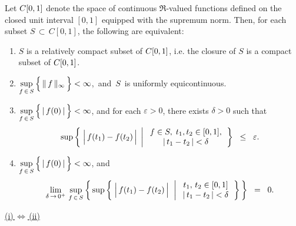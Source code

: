 \begin{theorem}
\label{BillingsleyArzelaAscoli}
\mbox{}\vskip 0.1cm
\noindent
Let $C[0,1]$ denote the space of continuous $\Re$-valued functions
defined on the closed unit interval $[0,1]$ equipped with the supremum norm.
Then, for each subset $S \,\subset\, C[0,1]$, the following are equivalent:
\begin{enumerate}
\item	$S$ is a relatively compact subset of $C[0,1]$, i.e. the closure of $S$ is a compact subset of $C[0,1]$.
\item	$\underset{f\,\in\,S}{\sup}\left\{\,\Vert\,\overset{{\color{white}.}}{f}\,\Vert_{\infty}\,\right\} < \infty$,\,
		and \,$S$\, is uniformly equicontinuous.
\item	$\underset{f\,\in\,S}{\sup}\left\{\,\vert\,\overset{{\color{white}.}}{f}(0)\,\vert\,\right\} < \infty$, and
		for each $\varepsilon > 0$, there exists $\delta > 0$ such that
		\begin{equation*}
		\sup\left\{\;
		\left\vert\,\overset{{\color{white}.}}{f}(t_{1}) - f(t_{2})\,\right\vert
		\;\left\vert\;
		\begin{array}{c} f \in S, \; t_{1},t_{2} \in [0,1], \\ \vert\,t_{1} - t_{2}\,\vert < \delta \end{array}
		\right.
		\right\}
		\;\;\leq\;\; \varepsilon.
		\end{equation*}
\item	$\underset{f\,\in\,S}{\sup}\left\{\,\vert\,\overset{{\color{white}.}}{f}(0)\,\vert\,\right\} < \infty$, and
		\begin{equation*}
		\lim_{\delta\,\rightarrow\,0^{+}}\,
			\sup_{f\,\in\,S}\left\{\,
				\sup\left\{\;
				\left\vert\,\overset{{\color{white}.}}{f}(t_{1}) - f(t_{2})\,\right\vert
				\,\;\left\vert\;
				\begin{array}{c} t_{1}, \, t_{2} \in [0,1] \\ \vert\,t_{1} - t_{2}\,\vert < \delta \end{array}
				\right.
				\right\}
			\,\right\}
		\;\;=\;\; 0.
		\end{equation*}
\end{enumerate}
\end{theorem}
\proof
\vskip 0.2cm
\noindent
\underline{(i)\,$\Longleftrightarrow$\,(ii)}
\vskip 0.1cm
